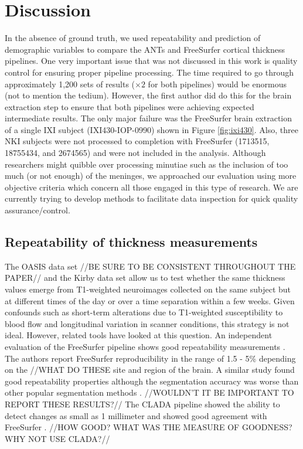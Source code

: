 \section{Discussion}
In the absence of ground truth, we used repeatability and prediction of
demographic variables to compare the ANTs and FreeSurfer cortical 
thickness pipelines.  One very important
issue that was not discussed in this work is quality control for
ensuring proper pipeline processing.  The time required to go through 
approximately 1,200 sets of results ($\times 2$ for both pipelines) would be
enormous (not to mention the tedium).  However, the first
author did do this for the brain extraction step to ensure that both pipelines
were achieving expected intermediate results.  The only
major failure was the FreeSurfer brain extraction of
a single IXI subject (IXI430-IOP-0990) shown in Figure \ref{fig:ixi430}.
Also, three NKI subjects were not processed to completion
with FreeSurfer (1713515, 18755434, and 2674565) and were not included in the analysis.
Although  researchers might quibble over processing minutiae such as the
inclusion of too much (or not enough) of the meninges, we approached
our evaluation using more objective criteria which concern all those
engaged in this type of research.  We are currently trying to develop methods
to facilitate data inspection for quick quality assurance/control.


\subsection{Repeatability of thickness measurements}
The OASIS data set //BE SURE TO BE CONSISTENT THROUGHOUT THE PAPER//
and the Kirby data set allow us to test whether the same
thickness values emerge from T1-weighted
neuroimages collected on the same subject but at different times of
the day or over a time separation within a few weeks.  Given confounds 
such as short-term alterations due to T1-weighted susceptibility to
blood flow \cite{Franklin2013,Salgado-Pineda2006,Yamasue2007} and
longitudinal variation in scanner conditions, 
this strategy is not ideal.  However, related
tools have looked at this question. 
An independent evaluation of the FreeSurfer pipeline shows good
repeatability measurements \cite{jovicich2013}. The authors report
FreeSurfer reproducibility in the range of 1.5 - 5\% depending on the
//WHAT DO THESE %
site and region of the brain.  A similar study found good
repeatability properties although the segmentation accuracy was worse 
than other popular segmentation methods \cite{eggert2012}.
//WOULDN'T IT BE IMPORTANT TO REPORT THESE RESULTS?//
The CLADA pipeline showed the ability to detect
changes as small as 1 millimeter and showed good agreement with
FreeSurfer \cite{nakamura2011}.
//HOW GOOD?  WHAT WAS THE MEASURE OF GOODNESS?  WHY NOT USE CLADA?//


